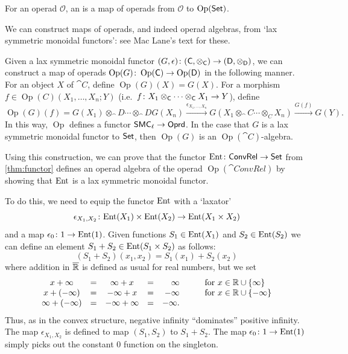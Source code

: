 \documentclass[12pt, reqno]{amsart}
\renewcommand{\O}{\mathcal{O}}
\DeclareMathOperator{\Op}{Op}
\newcommand{\C}{\cat{C}}
\newcommand{\D}{\cat{D}}
\newcommand{\extreal}{\overline{\real}}
\newcommand{\convrelC}{\cat{ConvRel}}
\begin{document}
\begin{definition}
    For an operad $\O$, an \define{$\O$-algebra} is a map of operads from $\O$ to $\Op(\setC)$.
\end{definition}

We can construct maps of operads, and indeed operad algebras, from `lax symmetric monoidal functors': see Mac Lane's text \cite{MacLane} for these.

\begin{construction}
\label{construction:operad_algebra}
    Given a lax symmetric monoidal functor $(G, \epsilon) \maps (\C, \otimes_\C) \to (\D, \otimes_\D)$, we can construct a map of operads $\Op(G) \maps \Op(\C) \to \Op(\D)$ in the following manner. For an object $X$ of $\C$, define $\Op(G)(X) = G(X)$. For a morphism $f \in \Op(C)(X_1, \ldots, X_n; Y)$ (i.e.\ $f \maps X_1 \otimes_\C \cdots \otimes_\C X_1 \to Y$), define
    \[\Op(G)(f) = G(X_1) \otimes_\D \cdots \otimes_\D G(X_n) \xrightarrow{\epsilon_{X_1, \ldots, X_n}} G(X_1 \otimes_\C \cdots \otimes_C X_n) \xrightarrow{G(f)} G(Y).\]
    In this way, $\Op$ defines a functor $\mathsf{SMC}_\ell \rightarrow \mathsf{Oprd}$.
    In the case that $G$ is a lax symmetric monoidal functor to $\mathsf{Set}$, then $\Op(G)$ is an $\Op(\C)$-algebra.
\end{construction}

Using this construction, we can prove that the functor $\Ent \maps \convrelC \to \setC$ from \cref{thm:functor} defines an operad algebra of the operad $\Op(\convrelC)$ by showing that $\mathrm{Ent}$ is a lax symmetric monoidal functor.

To do this, we need to equip the functor $\mathrm{Ent}$ with a `laxator' 
\[ \epsilon_{X_1, X_2} \colon \mathrm{Ent}(X_1) \times \mathrm{Ent}(X_2) \rightarrow \mathrm{Ent}(X_1 \times X_2)  \]
and a map $\epsilon_0 \colon 1 \rightarrow \mathrm{Ent}(1)$. 
Given functions $S_1 \in \mathrm{Ent}(X_1)$ and $S_2 \in \mathrm{Ent}(S_2)$ we can define an element $S_1+S_2\in \mathrm{Ent}(S_1 \times S_2)$ as follows:
\[ (S_1+S_2)(x_1,x_2) = S_1(x_1) + S_2(x_2) \]
where addition in $\extreal$ is defined as usual for real numbers, but we set
 \[ 
    \begin{array}{ccccrcl}
        x + \infty &=& \infty + x &=& \infty &\quad & \text{for $x \in \mathbb{R}$} \cup \{\infty\}\\ 
        x + (-\infty) &=& -\infty + x &=& -\infty &\quad& \text{for $x \in \mathbb{R}$} \cup \{-\infty\}\\
        \infty + (-\infty) &=& -\infty + \infty &=& 
        -\infty.
    \end{array}
    \]
Thus, as in the convex structure, negative infinity ``dominates'' positive infinity. The map $\epsilon_{X_1,X_2}$ is defined to map $(S_1,S_2)$ to $S_1+S_2$. The map $\epsilon_0 \colon 1 \rightarrow \mathrm{Ent}(1)$ simply picks out the constant $0$ function on the singleton.
\end{document}

